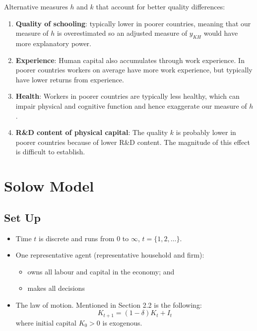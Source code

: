 \documentclass[11pt]{article}
\begin{document}
Alternative measures $h$ and $k$ that account for better quality differences:
\begin{enumerate}
    \item \textbf{Quality of schooling}: typically lower in poorer countries, meaning that our measure of $h$ is overestimated so an adjusted measure of $y_{KH}$ would have more explanatory power.
    \item \textbf{Experience}: Human capital also accumulates through work experience. In poorer countries workers on average have more work experience, but typically have lower returns from experience.
    \item \textbf{Health}: Workers in poorer countries are typically less healthy, which can impair physical and cognitive function and hence exaggerate our measure of $h$.
    \item \textbf{R\&D content of physical capital}: The quality $k$ is probably lower in poorer countries because of lower R\&D content. The magnitude of this effect is difficult to establish.
\end{enumerate}

\section{Solow Model}
\subsection*{Set Up}
\begin{shaded}
\begin{itemize}
    \item Time $t$ is discrete and runs from 0 to $\infty$, $t=\{1, 2, \ldots\}$.
    \item One representative agent (representative household and firm):
    \begin{itemize}
        \item owns all labour and capital in the economy; and
        \item makes all decisions
    \end{itemize}
    \item The law of motion. Mentioned in Section 2.2 is the following:
    \begin{equation}
        \label{capital stock}
        K_{t+1} = (1-\delta)K_t + I_t
    \end{equation}
    where initial capital $K_0>0$ is exogenous.
\end{itemize}
\end{shaded}
\end{document}
